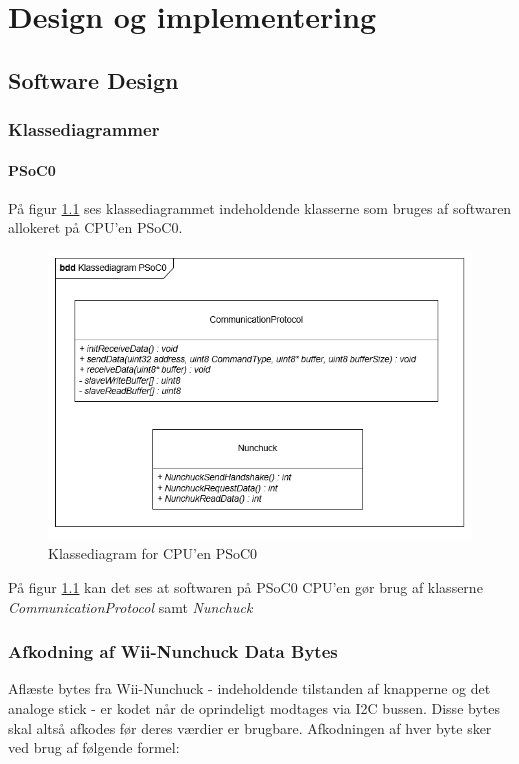 \chapter{Design og implementering}


\section{Software Design}

\subsection{Klassediagrammer}

\subsubsection{PSoC0}
På figur \ref{figure:PSoC0KlasseDiagram} ses klassediagrammet indeholdende klasserne som bruges af softwaren allokeret på CPU'en PSoC0.

\begin{figure}[H]
	\centering
	\includegraphics[width=\textwidth]{DesignOgImplementering/images/PSoC0KlasseDiagram}
	\caption{Klassediagram for CPU'en PSoC0}
	\label{figure:PSoC0KlasseDiagram}
\end{figure}

På figur \ref{figure:PSoC0KlasseDiagram} kan det ses at softwaren på PSoC0 CPU'en gør brug af klasserne \textit{CommunicationProtocol} samt \textit{Nunchuck}

\subsection{Afkodning af Wii-Nunchuck Data Bytes}
Aflæste bytes fra Wii-Nunchuck - indeholdende tilstanden af knapperne og det analoge stick - er kodet når de oprindeligt modtages via I2C bussen. Disse bytes skal altså afkodes før deres værdier er brugbare. Afkodningen af hver byte sker ved brug af følgende formel:

